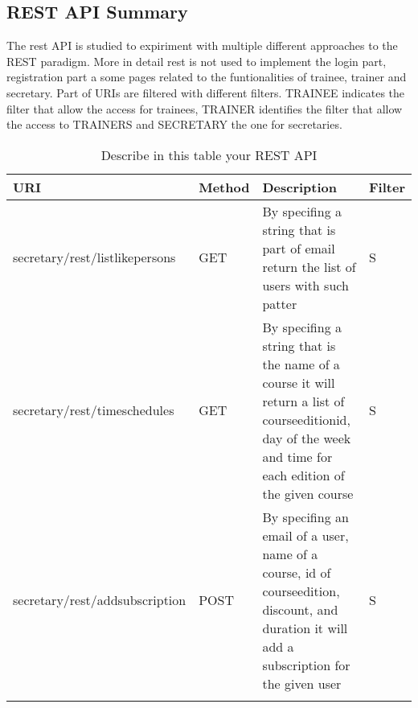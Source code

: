 \subsection{REST API Summary}

The rest API is studied to expiriment with multiple different approaches to the REST paradigm. 
More in detail rest is not used to implement the login part, registration part a some pages related to the funtionalities of trainee, trainer and secretary.
Part of URIs are filtered with different filters. TRAINEE indicates the filter that allow the access for trainees, TRAINER identifies the filter that allow the
access to TRAINERS and SECRETARY the one for secretaries.



\begin{longtable}{|p{}|p{} |p{}|p{}|} 
\hline
\textbf{URI} & \textbf{Method} & \textbf{Description} & \textbf{Filter} \\\hline
secretary/rest/listlikepersons & GET & By specifing a string that is part of email return the list of users with such patter  & S\\\hline

secretary/rest/timeschedules & GET & By specifing a string that is the name of a course it will return a list of courseeditionid, day of the week and time for each edition of the given course  & S\\\hline

secretary/rest/addsubscription & POST & By specifing an email of a user, name of a course, id of courseedition, discount, and duration it will add a subscription for the given user  & S\\\hline


\caption{Describe in this table your REST API}
\label{tab:termGlossary}
\end{longtable}